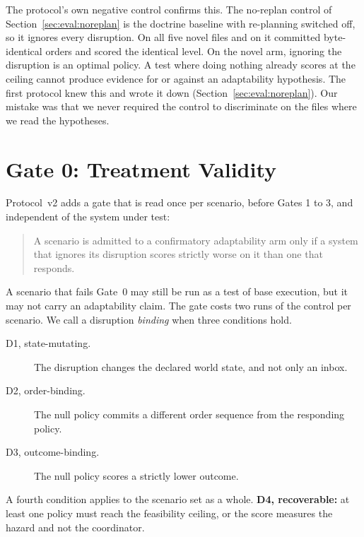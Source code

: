The protocol's own negative control \parencite{lipsitch2010} confirms this.
The no-replan control of Section~\ref{sec:eval:noreplan} is the doctrine
baseline with re-planning switched off, so it ignores every disruption. On all
five novel files and on  it committed byte-identical orders
and scored the identical level. On the novel arm, ignoring the disruption is
an optimal policy. A test where doing nothing already scores at the ceiling
cannot produce evidence for or against an adaptability hypothesis. The first
protocol knew this and wrote it down (Section~\ref{sec:eval:noreplan}). Our
mistake was that we never required the control to discriminate on the files
where we read the hypotheses.

\section{Gate 0: Treatment Validity}
\label{sec:crit:gate0}

Protocol~v2 adds a gate that is read once per scenario, before Gates 1 to 3,
and independent of the system under test:

\begin{quote}
A scenario is admitted to a confirmatory adaptability arm only if a system
that ignores its disruption scores strictly worse on it than one that
responds.
\end{quote}

A scenario that fails Gate~0 may still be run as a test of base execution, but
it may not carry an adaptability claim. The gate costs two runs of the control
per scenario. We call a disruption \emph{binding} when three conditions hold.

\begin{description}
\item[D1, state-mutating.] The disruption changes the declared world state,
  and not only an inbox.
\item[D2, order-binding.] The null policy commits a different order sequence
  from the responding policy.
\item[D3, outcome-binding.] The null policy scores a strictly lower outcome.
\end{description}

A fourth condition applies to the scenario set as a whole. \textbf{D4,
recoverable:} at least one policy must reach the feasibility ceiling, or the
score measures the hazard and not the coordinator.

